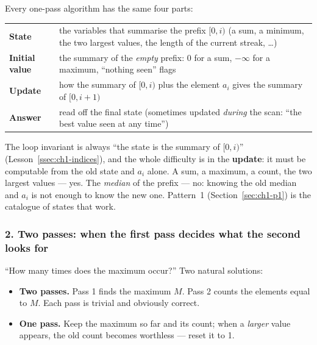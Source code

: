 Every one-pass algorithm has the same four parts:
\begin{table}[H]
\centering\small
\renewcommand{\arraystretch}{1.2}
\begin{tabularx}{\linewidth}{@{}>{\bfseries}l X@{}}
\toprule
State & the variables that summarise the prefix $[0, i)$ (a sum, a minimum, the two largest values, the length of the current streak, \ldots) \\
Initial value & the summary of the \emph{empty} prefix: $0$ for a sum, $-\infty$ for a maximum, ``nothing seen'' flags \\
Update & how the summary of $[0, i)$ plus the element $a_i$ gives the summary of $[0, i+1)$ \\
Answer & read off the final state (sometimes updated \emph{during} the scan: ``the best value seen at any time'') \\
\bottomrule
\end{tabularx}
\end{table}

The loop invariant is always ``the state is the summary of $[0, i)$'' (Lesson~\ref{ssec:ch1-indices}), and the whole difficulty is in the \textbf{update}: it must be computable from the old state and $a_i$ alone. A sum, a maximum, a count, the two largest values --- yes. The \emph{median} of the prefix --- no: knowing the old median and $a_i$ is not enough to know the new one. Pattern~1 (Section~\ref{sec:ch1-p1}) is the catalogue of states that work.

\subsubsection*{2. Two passes: when the first pass decides what the second looks for}

``How many times does the maximum occur?'' Two natural solutions:
\begin{itemize}[leftmargin=*]
    \item \textbf{Two passes.} Pass 1 finds the maximum $M$. Pass 2 counts the elements equal to $M$. Each pass is trivial and obviously correct.
    \item \textbf{One pass.} Keep the maximum so far and its count; when a \emph{larger} value appears, the old count becomes worthless --- reset it to 1.
\end{itemize}


